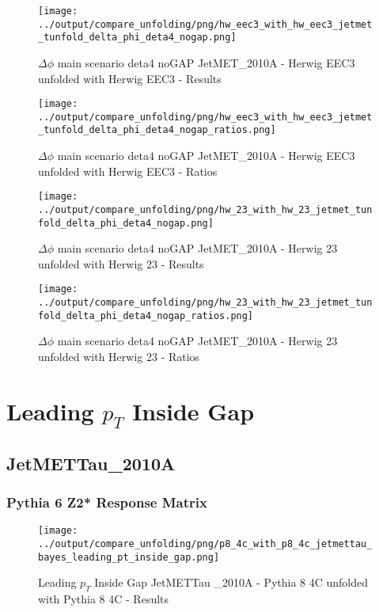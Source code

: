 \documentclass[11pt]{book}
\begin{document}
\begin{figure}[ht]
\centering
\texttt{[image: ../output/compare\_unfolding/png/hw\_eec3\_with\_hw\_eec3\_jetmet\_tunfold\_delta\_phi\_deta4\_nogap.png]}
\caption{$\Delta\phi$ main scenario deta4 noGAP JetMET\_2010A - Herwig EEC3 unfolded with Herwig EEC3 - Results}
\label{hw_eec3_hw_eec3_jetmet_tunfold_delta_phi_deta4_nogap_a}
\end{figure}

\begin{figure}[ht]
\centering
\texttt{[image: ../output/compare\_unfolding/png/hw\_eec3\_with\_hw\_eec3\_jetmet\_tunfold\_delta\_phi\_deta4\_nogap\_ratios.png]}
\caption{$\Delta\phi$ main scenario deta4 noGAP JetMET\_2010A - Herwig EEC3 unfolded with Herwig EEC3 - Ratios}
\label{hw_eec3_hw_eec3_jetmet_tunfold_delta_phi_deta4_nogap_b}
\end{figure}

\begin{figure}[ht]
\centering
\texttt{[image: ../output/compare\_unfolding/png/hw\_23\_with\_hw\_23\_jetmet\_tunfold\_delta\_phi\_deta4\_nogap.png]}
\caption{$\Delta\phi$ main scenario deta4 noGAP JetMET\_2010A - Herwig 23 unfolded with Herwig 23 - Results}
\label{hw_23_hw_23_jetmet_tunfold_delta_phi_deta4_nogap_a}
\end{figure}

\begin{figure}[ht]
\centering
\texttt{[image: ../output/compare\_unfolding/png/hw\_23\_with\_hw\_23\_jetmet\_tunfold\_delta\_phi\_deta4\_nogap\_ratios.png]}
\caption{$\Delta\phi$ main scenario deta4 noGAP JetMET\_2010A - Herwig 23 unfolded with Herwig 23 - Ratios}
\label{hw_23_hw_23_jetmet_tunfold_delta_phi_deta4_nogap_b}
\end{figure}




\newpage
\chapter{Leading $p_{T}$ Inside Gap}
\section{JetMETTau\_2010A}
\subsection{Pythia 6 Z2* Response Matrix}


\begin{figure}[ht]
\centering
\texttt{[image: ../output/compare\_unfolding/png/p8\_4c\_with\_p8\_4c\_jetmettau\_bayes\_leading\_pt\_inside\_gap.png]}
\caption{Leading $p_{T}$ Inside Gap JetMETTau \_2010A - Pythia 8 4C unfolded with Pythia 8 4C - Results}
\label{p8_p8_jetmettau_bayes_leading_pt_inside_gap_a}
\end{figure}
\end{document}
